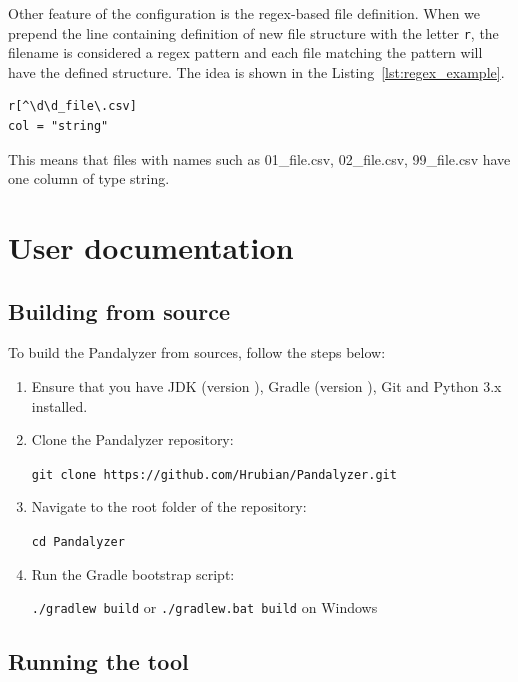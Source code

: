 Other feature of the configuration is the regex-based file definition.
When we prepend the line containing definition of new file structure with the letter \verb|r|, the filename is
considered a regex pattern and each file matching the pattern will have the defined structure.
The idea is shown in the Listing~\ref{lst:regex_example}.

\begin{lstlisting}[caption=An example regex-based file definition, label={lst:regex_example}, captionpos=b]
r[^\d\d_file\.csv]
col = "string"
\end{lstlisting}

This means that files with names such as 01\_file.csv, 02\_file.csv, 99\_file.csv have one column of type string.

\section{User documentation}

\subsection{Building from source}

To build the Pandalyzer from sources, follow the steps below:
\begin{enumerate}
    \item Ensure that you have JDK (version ), Gradle (version ), Git
    and Python 3.x installed.
    \item Clone the Pandalyzer repository:

    \verb|git clone https://github.com/Hrubian/Pandalyzer.git|
    \item Navigate to the root folder of the repository:

    \verb|cd Pandalyzer|
    \item Run the Gradle bootstrap script:

    \verb|./gradlew build| or \verb|./gradlew.bat build| on Windows
\end{enumerate}

\subsection{Running the tool}

